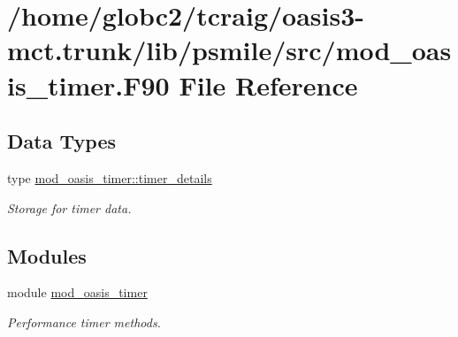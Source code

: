\hypertarget{mod__oasis__timer_8_f90}{}\section{/home/globc2/tcraig/oasis3-\/mct.trunk/lib/psmile/src/mod\+\_\+oasis\+\_\+timer.F90 File Reference}
\label{mod__oasis__timer_8_f90}
\subsection*{Data Types}
\begin{DoxyCompactItemize}
\item 
type \hyperlink{structmod__oasis__timer_1_1timer__details}{mod\+\_\+oasis\+\_\+timer\+::timer\+\_\+details}
\begin{DoxyCompactList}\small\item\em Storage for timer data. \end{DoxyCompactList}\end{DoxyCompactItemize}
\subsection*{Modules}
\begin{DoxyCompactItemize}
\item 
module \hyperlink{namespacemod__oasis__timer}{mod\+\_\+oasis\+\_\+timer}
\begin{DoxyCompactList}\small\item\em Performance timer methods. \end{DoxyCompactList}\end{DoxyCompactItemize}
